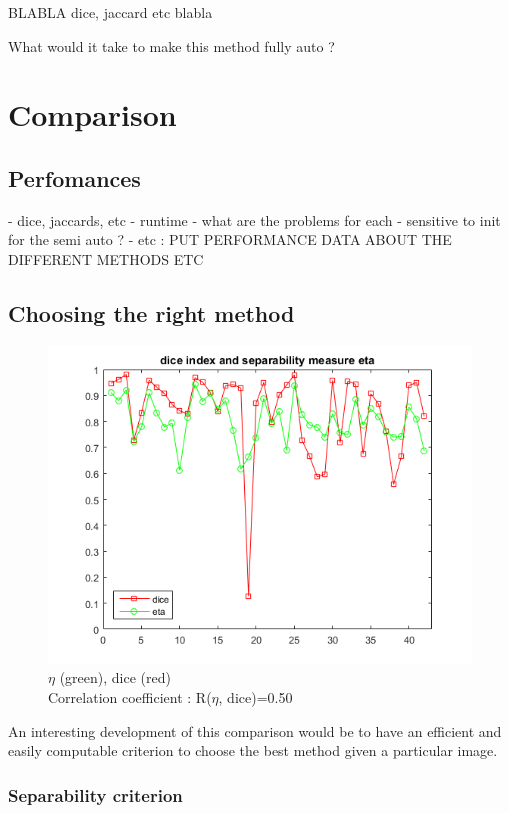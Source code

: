 \documentclass[a4paper,10pt]{article}
\begin{document}
BLABLA dice, jaccard etc
blabla

What would it take to make this method fully auto ?

\section{Comparison}

\subsection{Perfomances}
- dice, jaccards, etc
- runtime
- what are the problems for each
- sensitive to init for the semi auto ?
- etc : PUT PERFORMANCE DATA ABOUT THE DIFFERENT METHODS
ETC

\subsection{Choosing the right method}

\begin{figure}
	\centering
	\includegraphics[width=0.6\linewidth]{../results/selection-criterion/otsu-dice-jaccard-eta-plot}
	\caption{$\eta$ (green), dice (red)\\ Correlation coefficient : R($\eta$, dice)=0.50 }
	\label{fig:eta-correlation}
\end{figure}

An interesting development of this comparison would be to have an efficient and easily computable criterion to choose the best method given a particular image. 

\subsubsection{Separability criterion}
\end{document}
